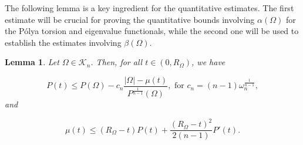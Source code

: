 \documentclass[oneside,a4paper,11pt,notitlepage]{article}
\newcommand{\abs}[1]{{\left|#1\right|}}
\theoremstyle{definition}
\theoremstyle{plain}
\newtheorem{lemma}[teorema]{Lemma}
\theoremstyle{definition}
\begin{document}
The following lemma is a key ingredient for the quantitative estimates. The first estimate will be crucial for proving the quantitative bounds involving $\alpha(\Omega)$ for the P\'olya torsion and eigenvalue functionals, while the second one will be used to establish the estimates involving $\beta(\Omega)$.
\begin{lemma}
Let $\Omega\in \mathcal{K}_n$. Then, for all $t\in (0,R_\Omega)$, we have

\begin{equation}
    \label{perimeter_estimate}
    P(t)\leq P(\Omega) - c_n \frac{\abs{\Omega} - \mu(t)}{P^{\frac{1}{n-1}}(\Omega)}, \text{ for } c_n=(n-1)\omega_n^{\frac{1}{n-1}},
\end{equation}
and 

\begin{equation}
    \label{measure_estimate1}
    \mu(t)\leq (R_\Omega-t)P(t)+ \frac{(R_\Omega-t)^2}{2(n-1)}P'(t).
\end{equation}
\end{lemma}
\end{document}
